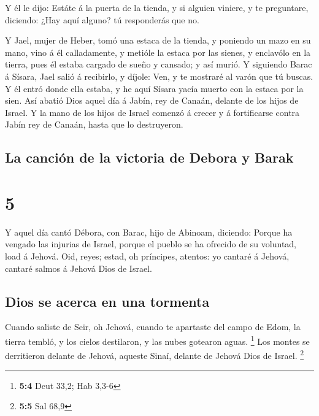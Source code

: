  Y él le dijo: Estáte á la puerta de la tienda, y si
alguien viniere, y te preguntare, diciendo: ¿Hay aquí alguno? tú
responderás que no.

 Y Jael, mujer de Heber, tomó una estaca de la tienda, y
poniendo un mazo en su mano, vino á él calladamente, y metióle la estaca
por las sienes, y enclavólo en la tierra, pues él estaba cargado de
sueño y cansado; y así murió.  Y siguiendo Barac á
Sísara, Jael salió á recibirlo, y díjole: Ven, y te mostraré al varón
que tú buscas. Y él entró donde ella estaba, y he aquí Sísara yacía
muerto con la estaca por la sien.  Así abatió Dios aquel
día á Jabín, rey de Canaán, delante de los hijos de Israel.
 Y la mano de los hijos de Israel comenzó á crecer y á
fortificarse contra Jabín rey de Canaán, hasta que lo destruyeron.

\hypertarget{la-canciuxf3n-de-la-victoria-de-debora-y-barak}{%
\subsection{La canción de la victoria de Debora y
Barak}\label{la-canciuxf3n-de-la-victoria-de-debora-y-barak}}

\hypertarget{section-4}{%
\section{5}\label{section-4}}

 Y aquel día cantó Débora, con Barac, hijo de Abinoam,
diciendo:  Porque ha vengado las injurias de Israel,
porque el pueblo se ha ofrecido de su voluntad, load á Jehová.
 Oid, reyes; estad, oh príncipes, atentos: yo cantaré á
Jehová, cantaré salmos á Jehová Dios de Israel.

\hypertarget{dios-se-acerca-en-una-tormenta}{%
\subsection{Dios se acerca en una
tormenta}\label{dios-se-acerca-en-una-tormenta}}

 Cuando saliste de Seir, oh Jehová, cuando te apartaste
del campo de Edom, la tierra tembló, y los cielos destilaron, y las
nubes gotearon aguas. \footnote{\textbf{5:4} Deut 33,2; Hab 3,3-6}
 Los montes se derritieron delante de Jehová, aqueste
Sinaí, delante de Jehová Dios de Israel. \footnote{\textbf{5:5} Sal 68,9}

